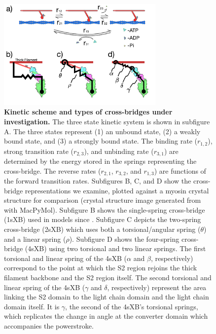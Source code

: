 \documentclass[]{article}
\begin{document}
\begin{figure}[ht]
    \begin{center}
    \includegraphics[width=3.2in]{../imgs/Figure1.pdf}
    \caption{
        \label{fig_xb_types}
        \textbf{Kinetic scheme and types of cross-bridges under investigation.} 
        The three state kinetic system is shown in subfigure A. 
        The three states represent (1) an unbound state, (2) a weakly bound state, and (3) a strongly bound state. 
        The binding rate ($r_{1,2}$), strong transition rate ($r_{2,3}$), and unbinding rate ($r_{3,1}$) are determined by the energy stored in the springs representing the cross-bridge. 
        The reverse rates ($r_{2,1}$, $r_{3,2}$, and $r_{1,3}$) are functions of the forward transition rates.
        Subfigures B, C, and D show the cross-bridge representations we examine, plotted against a myosin crystal structure for comparison (crystal structure image generated from \citet{Gourinath2003} with MacPyMol). 
        Subfigure B shows the single-spring cross-bridge (1sXB) used in models since \protect\citep{Huxley1957}. 
        Subfigure C depicts the two-spring cross-bridge (2sXB) which uses both a torsional/angular spring ($\theta$) and a linear spring ($\rho$). 
        Subfigure D shows the four-spring cross-bridge (4sXB) using two torsional and two linear springs. 
        The first torsional and linear spring of the 4sXB ($\alpha$ and $\beta$, respectively) correspond to the point at which the S2 region rejoins the thick filament backbone and the S2 region itself. 
        The second torsional and linear spring of the 4sXB ($\gamma$ and $\delta$, respectively) represent the area linking the S2 domain to the light chain domain and the light chain domain itself. 
It is $\gamma$, the second of the 4sXB's torsional springs, which replicates the change in angle at the converter domain which accompanies the powerstroke.  
    }
    \end{center}
\end{figure}
\end{document}
